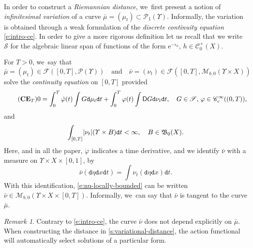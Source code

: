 \documentclass[10pt]{amsart}
\theoremstyle{definition}
\theoremstyle{remark}
\newtheorem{remark}[theorem]{Remark}
\DeclarePairedDelimiter{\abs}{\lvert}{\rvert}
\begin{document}
In order to construct a \emph{Riemannian distance}, we~first present a notion of \emph{infinitesimal variation} of a curve $\bar{\mu} = (\mu_{t}) \subset \mathscr{P}_{1}(\varUpsilon)$.
Informally, the variation is obtained through a weak formulation of the \emph{discrete continuity equation} \cref{e:intro-ce}.
In order to give a more rigorous definition let us recall that we write $\mathscr{S}$ for the algebraic linear span of functions of the form $\mathrm{e}^{-\iota_{h}}$, $h \in \mathscr{C}_{0}^{+}(X)$.

For $T > 0$, we~say that
\[
\bar{\mu} = (\mu_{t}) \in \mathscr{F}([0,T],\mathscr{P}(\varUpsilon))\quad\text{and}\quad \bar{\nu} = (\nu_{t}) \in \mathscr{F}([0,T], \mathscr{M}_{b,0}(\varUpsilon \times X))
\]
solve the \emph{continuity equation} on $[0,T]$ provided
\begin{equation}\label{e:ce}\tag{$\mathbf{CE}_{T}$}
0 = \int_{0}^{T} \dot{\varphi}(t) \int G \mathtt{d} \mu_{t} \mathtt{d} t + \int_{0}^{T} \varphi(t) \int \mathsf{D} G \mathtt{d} \nu_{t} \mathtt{d} t, \quad G \in \mathscr{S},\, \varphi \in \mathscr{C}_{c}^{\infty}((0,T)),
\end{equation}
and
\begin{equation}\label{e:nu-locally-bounded}
\int_{[0,T]} \abs{\nu_{t}}(\varUpsilon \times B) \mathtt{d} t < \infty, \quad B \in \mathfrak{B}_{0}(X).
\end{equation}
Here, and in all the paper, $\dot{\varphi}$ indicates a time derivative, and we identify $\bar{\nu}$ with a measure on $\varUpsilon \times X \times [0,1]$, by
\begin{equation*}
\bar{\nu}(\mathtt{d} \eta \mathtt{d} x \mathtt{d} t) = \int \nu_{t}(\mathtt{d} \eta \mathtt{d} x) \mathtt{d} t.
\end{equation*}
With this identification, \cref{e:nu-locally-bounded} can be written $\bar{\nu} \in \mathscr{M}_{b,0}(\varUpsilon \times X \times [0,T])$.
Informally, we~can say that $\bar{\nu}$ is tangent to the curve $\bar{\mu}$.

\begin{remark}
Contrary to \cref{e:intro-ce}, the curve $\bar{\nu}$ does not depend explicitly on $\bar{\mu}$.
When constructing the distance in \cref{s:variational-distance}, the action functional will automatically select solutions of a particular form.
\end{remark}
\end{document}
